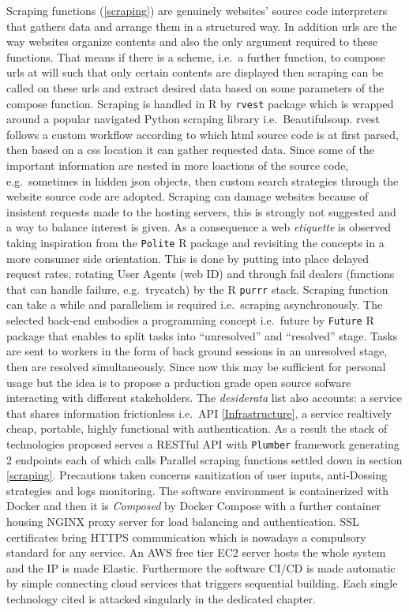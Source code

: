 \documentclass[
  12pt,
  a4paper,
  oneside]{book}
\newcommand{\passthrough}[1]{#1}
\theoremstyle{definition}
\theoremstyle{definition}
\theoremstyle{definition}
\theoremstyle{remark}
\begin{document}
Scraping functions (\ref{scraping}) are genuinely websites' source code interpreters that gathers data and arrange them in a structured way. In addition urls are the way websites organize contents and also the only argument required to these functions. That means if there is a scheme, i.e.~a further function, to compose urls at will such that only certain contents are displayed then scraping can be called on these urls and extract desired data based on some parameters of the compose function. Scraping is handled in R by \passthrough{\lstinline!rvest!} package which is wrapped around a popular navigated Python scraping library i.e.~Beautifulsoup. rvest follows a custom workflow according to which html source code is at first parsed, then based on a css location it can gather requested data. Since some of the important information are nested in more loactions of the source code, e.g.~sometimes in hidden json objects, then custom search strategies through the website source code are adopted. Scraping can damage websites because of insistent requests made to the hosting servers, this is strongly not suggested and a way to balance interest is given. As a consequence a web \emph{etiquette} is observed taking inspiration from the \passthrough{\lstinline!Polite!} R package and revisiting the concepts in a more consumer side orientation. This is done by putting into place delayed request rates, rotating User Agents (web ID) and through fail dealers (functions that can handle failure, e.g.~trycatch) by the R \passthrough{\lstinline!purrr!} stack. Scraping function can take a while and parallelism is required i.e.~scraping asynchronously. The selected back-end embodies a programming concept i.e.~future by \passthrough{\lstinline!Future!} R package that enables to split tasks into ``unresolved'' and ``resolved'' stage. Tasks are sent to workers in the form of back ground sessions in an unresolved stage, then are resolved simultaneously. Since now this may be sufficient for personal usage but the idea is to propose a prduction grade open source sofware interacting with different stakeholders. The \emph{desiderata} list also accounts: a service that shares information frictionless i.e.~API \ref{Infrastructure}, a service realtively cheap, portable, highly functional with authentication. As a result the stack of technologies proposed serves a RESTful API with \passthrough{\lstinline!Plumber!} framework generating 2 endpoints each of which calls Parallel scraping functions settled down in section \ref{scraping}. Precautions taken concerns sanitization of user inputs, anti-Dossing strategies and logs monitoring. The software environment is containerized with Docker and then it is \emph{Composed} by Docker Compose with a further container housing NGINX proxy server for load balancing and authentication. SSL certificates bring HTTPS communication which is nowadays a compulsory standard for any service. An AWS free tier EC2 server hosts the whole system and the IP is made Elastic. Furthermore the software CI/CD is made automatic by simple connecting cloud services that triggers sequential building. Each single technology cited is attacked singularly in the dedicated chapter.
\end{document}
